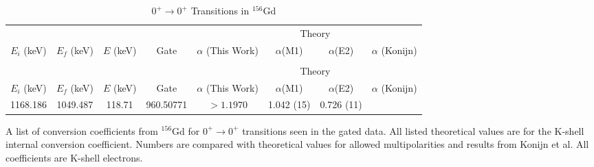 \begin{landscape}
    \begin{longtable}{c|c|c|c|c|c|c|c}
        \caption{$0^+\rightarrow 0^+$ Transitions in $^{156}$Gd}
        \label{tab:156Gd_0_to_0}\\
        \toprule
        &	& 	&  &	& \multicolumn{2}{c}{Theory}	& 	\\
        $E_i$ (keV)	&	$E_f$ (keV)	& $E$ (keV)	&	Gate &		$\alpha$ (This Work)	& $\alpha$(M1) & $\alpha$(E2) &	$\alpha$ (Konijn)	\\
        \hline
        \endfirsthead
        \toprule
        \caption[]{$0^+\rightarrow 0^+$ Transitions in $^{156}$Gd}\\
        &	& 	&  &	& \multicolumn{2}{c}{Theory}	& 	\\
        $E_i$ (keV)	&	$E_f$ (keV)	& $E$ (keV)	&	Gate &		$\alpha$ (This Work)	& $\alpha$(M1) & $\alpha$(E2) &	$\alpha$ (Konijn)	\\
	    \endhead
        1168.186 & 1049.487  & 118.71 &  960.50771 & $>1.1970$ & 1.042 (15) & 0.726 (11) & \\
        \bottomrule
    \end{longtable}
    \caption{A list of conversion coefficients from $^{156}$Gd for $0^+\rightarrow 0^+$ transitions seen in the gated data. All listed theoretical values are for the K-shell internal conversion coefficient. Numbers are compared with theoretical values for allowed multipolarities and results from Konijn et al.\citep{konjin81:_156gd} All coefficients are K-shell electrons.}
\end{landscape}